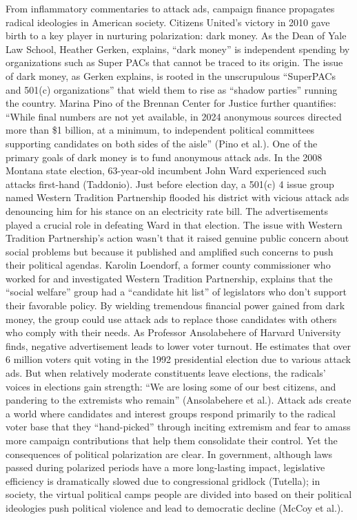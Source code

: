 From inflammatory commentaries to attack ads, campaign finance propagates radical ideologies in American society. Citizens United’s victory in 2010 gave birth to a key player in nurturing polarization: dark money. As the Dean of Yale Law School, Heather Gerken, explains, “dark money” is independent spending by organizations such as Super PACs that cannot be traced to its origin. The issue of dark money, as Gerken explains, is rooted in the unscrupulous “SuperPACs and 501(c) organizations” that wield them to rise as “shadow parties” running the country. Marina Pino of the Brennan Center for Justice further quantifies: “While final numbers are not yet available, in 2024 anonymous sources directed more than \$1 billion, at a minimum, to independent political committees supporting candidates on both sides of the aisle” (Pino et al.). One of the primary goals of dark money is to fund anonymous attack ads. In the 2008 Montana state election, 63-year-old incumbent John Ward experienced such attacks first-hand (Taddonio). Just before election day, a 501(c) 4 issue group named Western Tradition Partnership flooded his district with vicious attack ads denouncing him for his stance on an electricity rate bill. The advertisements played a crucial role in defeating Ward in that election. The issue with Western Tradition Partnership’s action wasn’t that it raised genuine public concern about social problems but because it published and amplified such concerns to push their political agendas. Karolin Loendorf, a former county commissioner who worked for and investigated Western Tradition Partnership, explains that the “social welfare” group had a “candidate hit list” of legislators who don't support their favorable policy. By wielding tremendous financial power gained from dark money, the group could use attack ads to replace those candidates with others who comply with their needs. As Professor Ansolabehere of Harvard University finds, negative advertisement leads to lower voter turnout. He estimates that over 6 million voters quit voting in the 1992 presidential election due to various attack ads. But when relatively moderate constituents leave elections, the radicals’ voices in elections gain strength: “We are losing some of our best citizens, and pandering to the extremists who remain” (Ansolabehere et al.). Attack ads create a world where candidates and interest groups respond primarily to the radical voter base that they “hand-picked” through inciting extremism and fear to amass more campaign contributions that help them consolidate their control. Yet the consequences of political polarization are clear. In government, although laws passed during polarized periods have a more long-lasting impact, legislative efficiency is dramatically slowed due to congressional gridlock (Tutella); in society, the virtual political camps people are divided into based on their political ideologies push political violence and lead to democratic decline (McCoy et al.). 

